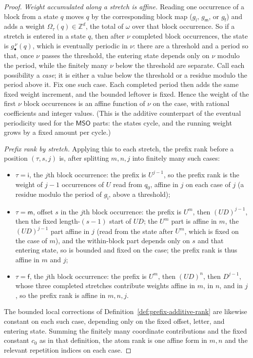 \documentclass[10pt,a4paper]{amsart}
\newcommand{\MSO}{\mathsf{MSO}}
\newcommand{\Z}{\mathbb Z}
\begin{document}
\begin{proof}
\vspace{0.5em}
\noindent\emph{Weight accumulated along a stretch is affine.}  Reading one occurrence of a block
from a state $q$ moves $q$ by the corresponding block map ($g_{\mathsf i}$,
$g_{\mathsf m}$, or $g_{\mathsf f}$) and adds a weight $\Omega_\tau(q)\in\Z^d$, the
total of $\omega$ over that block occurrence.  So if a stretch is entered in a state $q$, then
after $\nu$ completed block occurrences, the state is
$g_\bullet^{\,\nu}(q)$, which is eventually periodic in $\nu$: there are a threshold and a period so that, once $\nu$ passes the
threshold, the entering state depends only on $\nu$ modulo the period, while the
finitely many $\nu$ below the threshold are separate.  Call each possibility a
\emph{case}; it is either a value below the threshold or a residue modulo the
period above it.  Fix one such case.  Each completed period then adds the same
fixed weight increment, and the bounded leftover is fixed.  Hence the weight
of the first $\nu$ block occurrences is an affine function of $\nu$ on the
case, with rational coefficients and integer values.  (This is
the additive counterpart of the eventual periodicity used for the $\MSO$
parts: the states cycle, and the running weight grows by a fixed amount per
cycle.)

\vspace{0.5em}
\noindent\emph{Prefix rank by stretch.}  Applying this to each stretch, the prefix rank
before a position $(\tau,s,j)$ is, after splitting $m,n,j$ into finitely many such
cases:
\begin{itemize}
\item $\tau=\mathsf i$, the $j$th block occurrence: the prefix is $U^{j-1}$, so the prefix rank is the
weight of $j-1$ occurrences of $U$ read from $q_0$, affine in $j$ on each case of $j$
(a residue modulo the period of $g_{\mathsf i}$, above a threshold);
\item $\tau=\mathsf m$, offset $s$ in the $j$th block occurrence: the prefix is $U^m$, then
$(UD)^{j-1}$, then the fixed length-$(s-1)$ start of $UD$; the $U^m$ part is affine
in $m$, the $(UD)^{j-1}$ part affine in $j$ (read from the state after $U^m$, which
is fixed on the case of $m$), and the within-block part depends only on $s$
and that entering state, so is bounded and fixed on the case; the prefix rank
is thus affine in $m$ and $j$;
\item $\tau=\mathsf f$, the $j$th block occurrence: the prefix is $U^m$, then $(UD)^n$, then
$D^{j-1}$, whose three completed stretches contribute weights affine in $m$, in
$n$, and in $j$, so the prefix rank is affine in $m,n,j$.
\end{itemize}
The bounded local corrections of Definition~\ref{def:prefix-additive-rank} are
likewise constant on each such case, depending only on the fixed offset,
letter, and entering state.  Summing the finitely many coordinate contributions
and the fixed constant $c_0$ as in that definition, the atom rank is one affine
form in $m,n$ and the relevant repetition indices on each case.


\end{proof}
\end{document}
